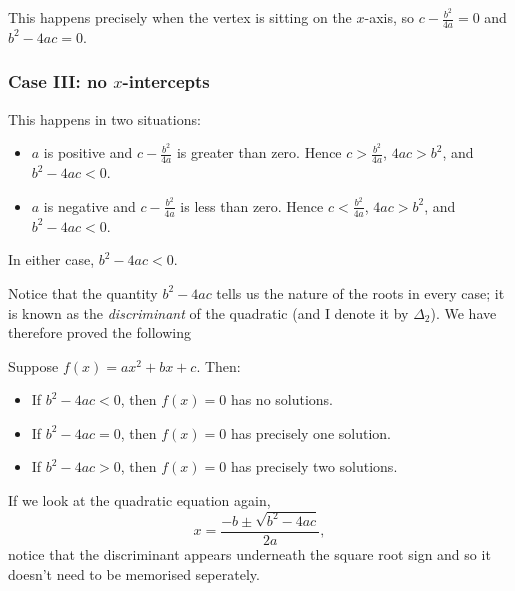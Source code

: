 This happens precisely when the vertex is sitting on the $ x$-axis, so $ c - \frac{b^2}{4a} = 0 $ and $ b^2 - 4ac = 0 $.

\subsubsection*{Case III: no $ x$-intercepts}
\begin{center}
\end{center}

This happens in two situations:
\begin{itemize}
  \item $ a $ is positive and $ c - \frac{b^2}{4a} $ is greater than zero. Hence $ c > \frac{b^2}{4a} $, $ 4ac > b^2 $, and $ b^2 - 4ac < 0 $.
  \item $ a $ is negative and $ c - \frac{b^2}{4a} $ is less than zero. Hence $ c < \frac{b^2}{4a} $, $ 4ac > b^2 $, and $ b^2 - 4ac < 0 $.
\end{itemize}

In either case, $ b^2 - 4ac < 0 $.

Notice that the quantity $ b^2 - 4ac $ tells us the nature of the roots in every case; it is known as the \emph{discriminant} of
the quadratic (and I denote it by $ \Delta_2 $). We have therefore proved the following
\begin{thm}
  Suppose $ f(x) = ax^2 + bx + c $. Then:
  \begin{itemize}
    \item If $ b^2 - 4ac < 0 $, then $ f(x) = 0 $ has no solutions.
    \item If $ b^2 - 4ac = 0 $, then $ f(x) = 0 $ has precisely one solution.
    \item If $ b^2 - 4ac > 0 $, then $ f(x) = 0 $ has precisely two solutions.
  \end{itemize}
\end{thm}

If we look at the quadratic equation again,
\begin{displaymath}
  x = \frac{-b \pm \sqrt{b^2 - 4ac}}{2a},
\end{displaymath}
notice that the discriminant appears underneath the square root sign and so it doesn't need to be memorised seperately.

